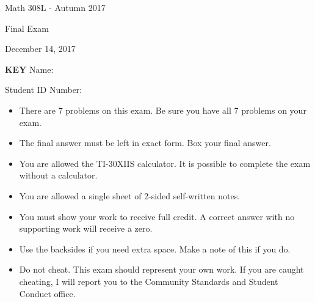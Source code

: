 \documentclass[addpoints]{exam}
\begin{document}
\begin{center}
Math 308L - Autumn 2017

Final Exam

December 14, 2017
\end{center}

\ifprintanswers
\textbf{\huge KEY}
\else
Name: \hrulefill

Student ID Number: \hrulefill
\fi

\vspace{0.3cm}

\begin{center}
    \gradetable[v][questions]
\end{center}

\vspace{0.3cm}

\begin{itemize}
    \item
        There are 7 problems on this exam. Be sure you have all 7 problems on
        your exam.
    \item
        The final answer must be left in exact form. Box your final answer.
    \item
        You are allowed the TI-30XIIS calculator. It is possible to complete
        the exam without a calculator.
    \item
        You are allowed a single sheet of 2-sided self-written notes.
    \item
        You must show your work to receive full credit. A correct answer
        with no supporting work will receive a zero.
    \item
        Use the backsides if you need extra space. Make a note of this if you
        do.
    \item
        Do not cheat. This exam should represent your own work. If you are
        caught cheating, I will report you to the Community Standards and
        Student Conduct office.
\end{itemize}
\end{document}

